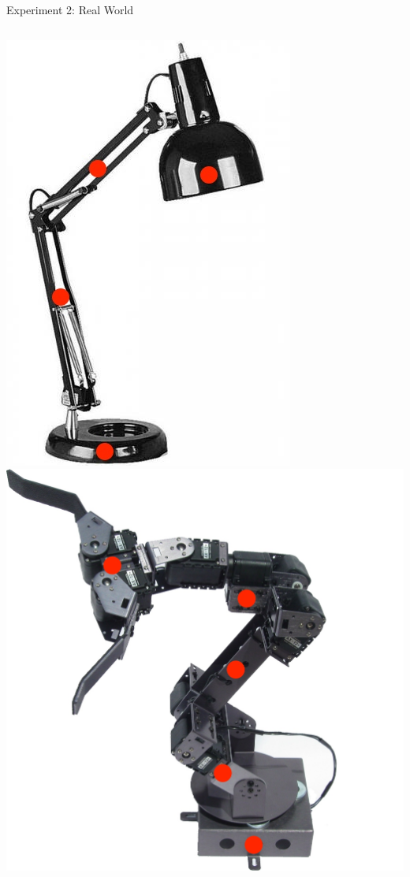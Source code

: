 \documentclass{beamer}
\begin{document}
    \begin{frame}{Experiment 2: Real World}
      \begin{columns}[t]
        \pause
        \includegraphics[width=.4\textwidth]{img/lamp.jpg}
        \includegraphics[width=.54\textwidth]{img/arm.jpg}
        \linebreak
        \linebreak
        \linebreak
        \pause

\end{columns}
\end{frame}
\end{document}
